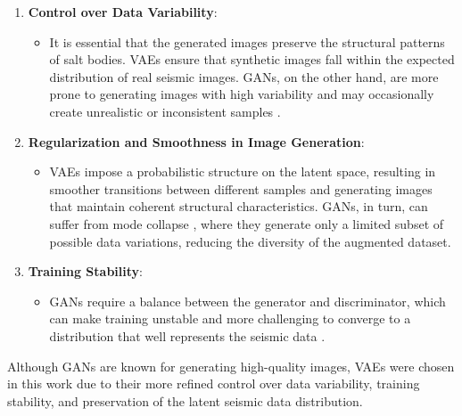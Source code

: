 \documentclass{ieeeaccess}
\begin{document}
\begin{enumerate}
    \item \textbf{Control over Data Variability}:
    \begin{itemize}
        \item It is essential that the generated images preserve the structural patterns of salt bodies. VAEs ensure that synthetic images fall within the expected distribution of real seismic images. GANs, on the other hand, are more prone to generating images with high variability and may occasionally create unrealistic or inconsistent samples \cite{ref16}.
    \end{itemize}
    \item \textbf{Regularization and Smoothness in Image Generation}:
    \begin{itemize}
        \item VAEs impose a probabilistic structure on the latent space, resulting in smoother transitions between different samples and generating images that maintain coherent structural characteristics. GANs, in turn, can suffer from mode collapse \cite{ref16}, where they generate only a limited subset of possible data variations, reducing the diversity of the augmented dataset.
    \end{itemize}
    \item \textbf{Training Stability}:
    \begin{itemize}
        \item GANs require a balance between the generator and discriminator, which can make training unstable and more challenging to converge to a distribution that well represents the seismic data \cite{ref16}.
    \end{itemize}
\end{enumerate}

Although GANs are known for generating high-quality images, VAEs were chosen in this work due to their more refined control over data variability, training stability, and preservation of the latent seismic data distribution.
\end{document}
